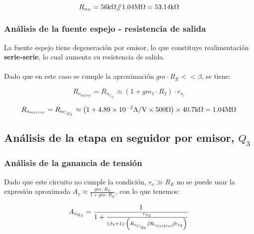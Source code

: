 \begin{equation*}
R_{o_{D}} = 56 \si[per-mode=symbol]{\kilo\ohm} \parallelresistors 1.04 \si[per-mode=symbol]{\mega\ohm} = 53.14 \si[per-mode=symbol]{\kilo\ohm}
\end{equation*}


\subsubsection{Análisis de la fuente espejo - resistencia de salida}

La fuente espejo tiene degeneración por emisor, lo que constituye realimentación \textbf{serie-serie}, lo cual aumenta su resistencia de salida.\\ \\
Dado que en este caso se cumple la aproximación $gm \cdot R_{E} << \beta$, se tiene:

\begin{equation}
R_{o_{mirror}} = R_{o_{C_{Q_{1}}}} \approx \left( 1 + gm_{1} \cdot R_{2} \right) \cdot r_{o_{1}}
\end{equation} 

\begin{equation*}
R_{o_{mirror}} = R_{o_{C_{Q_{1}}}} \approx \left( 1 + \num{4.89E-2} \si[per-mode=symbol]{\ampere\per\volt}  \times 500 \si[per-mode=symbol]{\ohm}  \right) \times 40.7 \si[per-mode=symbol]{\kilo\ohm} = 1.04 \si[per-mode=symbol]{\mega\ohm}
\end{equation*} 

\subsection{Análisis de la etapa en seguidor por emisor, $Q_{3}$}


\subsubsection{Análisis de la ganancia de tensión}

Dado que este circuito no cumple la condición, $r_{o} \gg R_{E}$ no se puede usar la expresión aproximada $A_{v} \approx \frac{gm \cdot R_{E}}{1 + gm \cdot R_{E}}$, con lo que tenemos:

\begin{equation}
A_{v_{Q_{3}}} = \frac{1}{1 + \frac{r_{\pi_{3}}}{  \left(  \beta_{3} + 1 \right) \cdot \left(  R_{o_{C_{Q_{6}}}} \parallelresistors R_{i_{Sziklai}} \parallelresistors r_{o_{3}}  \right)  } }
\end{equation}


